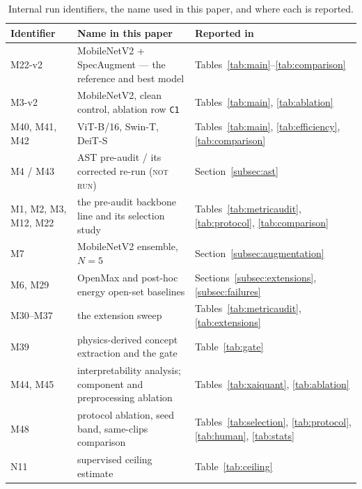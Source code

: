 \documentclass[journal,onecolumn]{IEEEtran}
\newcommand{\notrun}{\textsc{not run}}
\begin{document}
\begin{table}[!h]
\centering
\caption{Internal run identifiers, the name used in this paper, and where each is reported.}
\label{tab:runmap}
\footnotesize
\begin{tabular}{lll}
\toprule
Identifier & Name in this paper & Reported in \\
\midrule
M22-v2 & MobileNetV2 + SpecAugment --- the reference and best model & Tables~\ref{tab:main}--\ref{tab:comparison} \\
M3-v2 & MobileNetV2, clean control, ablation row \texttt{C1} & Tables~\ref{tab:main}, \ref{tab:ablation} \\
M40, M41, M42 & ViT-B/16, Swin-T, DeiT-S & Tables~\ref{tab:main}, \ref{tab:efficiency}, \ref{tab:comparison} \\
M4 / M43 & AST pre-audit / its corrected re-run (\notrun) & Section~\ref{subsec:ast} \\
M1, M2, M3, M12, M22 & the pre-audit backbone line and its selection study & Tables~\ref{tab:metricaudit}, \ref{tab:protocol}, \ref{tab:comparison} \\
M7 & MobileNetV2 ensemble, $N = 5$ & Section~\ref{subsec:augmentation} \\
M6, M29 & OpenMax and post-hoc energy open-set baselines & Sections~\ref{subsec:extensions}, \ref{subsec:failures} \\
M30--M37 & the extension sweep & Tables~\ref{tab:metricaudit}, \ref{tab:extensions} \\
M39 & physics-derived concept extraction and the gate & Table~\ref{tab:gate} \\
M44, M45 & interpretability analysis; component and preprocessing ablation & Tables~\ref{tab:xaiquant}, \ref{tab:ablation} \\
M48 & protocol ablation, seed band, same-clips comparison & Tables~\ref{tab:selection}, \ref{tab:protocol}, \ref{tab:human}, \ref{tab:stats} \\
N11 & supervised ceiling estimate & Table~\ref{tab:ceiling} \\
\bottomrule
\end{tabular}
\end{table}



\end{document}
